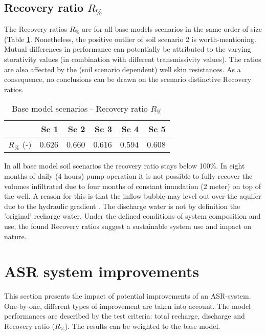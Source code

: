 \subsection{Recovery ratio $R_\%$}
The Recovery ratios $R_\%$ are for all base models scenarios in the same order of size (Table \ref{tab:Base_RR}. Nonetheless, the positive outlier of soil scenario 2 is worth-mentioning. Mutual differences in performance can potentially be attributed to the varying storativity values (in combination with different transmissivity values). The ratios are also affected by the (soil scenario dependent) well skin resistances. As a consequence, no conclusions can be drawn on the scenario distinctive Recovery ratios. \\ 

\begin{table}[h!]
\small
\centering
\caption{Base model scenarios - Recovery ratio $R_\%$}
\label{tab:Base_RR}
\begin{tabular}{l|r|r|r|r|r}
\hline 
\textbf{}               & \textbf{Sc 1} & \textbf{Sc 2} & \textbf{Sc 3} & \textbf{Sc 4}  & \textbf{Sc 5} \\ \hline \hline
$R_\%$ (-)              &  0.626        & 0.660         & 0.616         & 0.594 	     & 0.608 	          \\ \hline    
\end{tabular}
\end{table}

In all base model soil scenarios the recovery ratio stays below 100\%. In eight months of daily (4 hours) pump operation it is not possible to fully recover the volumes infiltrated due to four months of constant inundation (2 meter) on top of the well. A reason for this is that the inflow bubble may level out over the aquifer due to the hydraulic gradient \citep{Bakker2010}. The discharge water is not by definition the 'original' recharge water. Under the defined conditions of system composition and use, the found Recovery ratios suggest a sustainable system use and impact on nature. \\

\section{ASR system improvements}
\label{section:ASR_upscaling}
This section presents the impact of potential improvements of an ASR-system. One-by-one, different types of improvement are taken into account. The model performances are described by the test criteria: total recharge, discharge and Recovery ratio ($R_{\%}$). The results can be weighted to the base model. 

